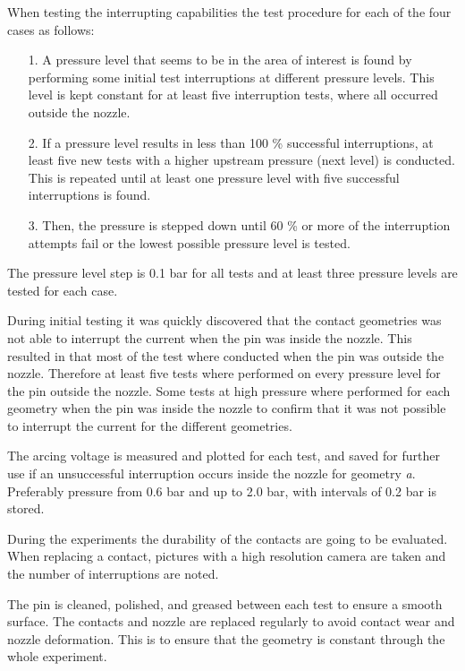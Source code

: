 \documentclass[10pt,a4paper,twoside]{article}
\begin{document}
When testing the interrupting capabilities the test procedure for each of the four cases as follows: 
\begin{itemize}
\item[1.] A pressure level that seems to be in the area of interest is found by performing some initial test interruptions at different pressure levels. This level is kept constant for at least five interruption tests, where all occurred outside the nozzle.
\item[2.] If a pressure level results in less than 100 \% successful interruptions, at least five new tests with a higher upstream pressure (next level) is conducted. This is repeated until at least one pressure level with five successful interruptions is found.
\item[3.] Then, the pressure is stepped down until 60 \% or more of the interruption attempts fail or the lowest possible pressure level is tested.
\end{itemize}

The pressure level step is 0.1 bar for all tests and at least three pressure levels are tested for each case.\newline

During initial testing it was quickly discovered that the contact geometries was not able to interrupt the current when the pin was inside the nozzle. This resulted in that most of the test where conducted when the pin was outside the nozzle. Therefore at least five tests where performed on every pressure level for the pin outside the nozzle. Some tests at high pressure where performed for each geometry when the pin was inside the nozzle to confirm that it was not possible to interrupt the current for the different geometries.

The arcing voltage is measured and plotted for each test, and saved for further use if an unsuccessful interruption occurs inside the nozzle for geometry \textit{a}. Preferably pressure from 0.6 bar and up to 2.0 bar, with intervals of 0.2 bar is stored.

During the experiments the durability of the contacts are going to be evaluated. When replacing a contact, pictures with a high resolution camera are taken and the number of interruptions are noted. 

The pin is cleaned, polished, and greased between each test to ensure a smooth surface. The contacts and nozzle are replaced regularly to avoid contact wear and nozzle deformation. This is to ensure that the geometry is constant through the whole experiment.
\end{document}
